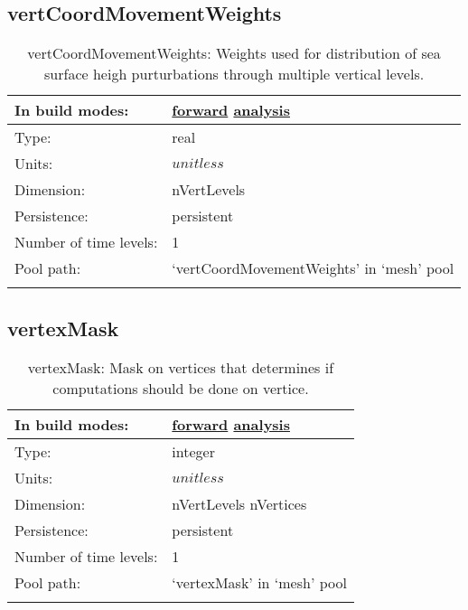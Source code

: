 \subsection[vertCoordMovementWeights]{vertCoordMovementWeights}
\label{subsec:var_sec_mesh_vertCoordMovementWeights}
\begin{center}
\begin{longtable}{| p{2.0in} | p{4.0in} |}
        \hline 
        In build modes: & \hyperref[subsec:forward_var_tab_mesh]{forward} \hyperref[subsec:analysis_var_tab_mesh]{analysis} \\
        \hline 
        Type: & real \\
        \hline 
        Units: & $unitless$ \\
        \hline 
        Dimension: & nVertLevels \\
        \hline 
        Persistence: & persistent \\
        \hline 
        Number of time levels: & 1 \\
        \hline 
            Pool path: & `vertCoordMovementWeights' in `mesh' pool \\
		 \hline 
    \caption{vertCoordMovementWeights: Weights used for distribution of sea surface heigh purturbations through multiple vertical levels.}
\end{longtable}
\end{center}
\subsection[vertexMask]{vertexMask}
\label{subsec:var_sec_mesh_vertexMask}
\begin{center}
\begin{longtable}{| p{2.0in} | p{4.0in} |}
        \hline 
        In build modes: & \hyperref[subsec:forward_var_tab_mesh]{forward} \hyperref[subsec:analysis_var_tab_mesh]{analysis} \\
        \hline 
        Type: & integer \\
        \hline 
        Units: & $unitless$ \\
        \hline 
        Dimension: & nVertLevels nVertices \\
        \hline 
        Persistence: & persistent \\
        \hline 
        Number of time levels: & 1 \\
        \hline 
            Pool path: & `vertexMask' in `mesh' pool \\
		 \hline 
    \caption{vertexMask: Mask on vertices that determines if computations should be done on vertice.}
\end{longtable}
\end{center}
